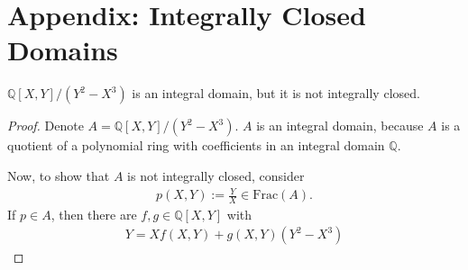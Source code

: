 \section{Appendix: Integrally Closed Domains}

\begin{exmbox}
    \begin{example}
        \(\mathbb{Q}[X, Y] / (Y^2 - X^3)\) is an integral domain, but it is not integrally closed.
    \end{example}
\end{exmbox}
\begin{proof}
    Denote \(A = \mathbb{Q}[X, Y] / (Y^2 - X^3)\). \(A\) is an integral domain, because \(A\) is a quotient of a polynomial ring with coefficients in an integral domain \(\mathbb{Q}\).

    Now, to show that \(A\) is not integrally closed, consider
    \begin{align*}
        p(X, Y) := \frac{Y}{X} \in \mathrm{Frac}(A) \text{.}
    \end{align*}
    If \(p \in A\), then there are \(f, g \in \mathbb{Q}[X, Y]\) with
    \begin{align*}
        Y = X f(X, Y) + g(X, Y)(Y^2 - X^3)
    \end{align*}
\end{proof}